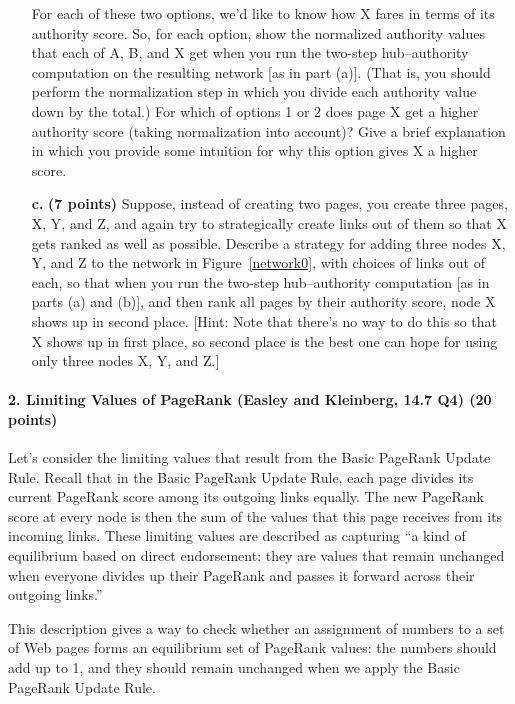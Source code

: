 \documentclass[11pt]{article}
\begin{document}
\begin{itemize}
For each of these two options, we’d like to know how X fares in terms
of its authority score. So, for each option, show the normalized authority
values that each of A, B, and X get when you run the two-step hub–authority
computation on the resulting network [as in part (a)]. (That is, you should
perform the normalization step in which you divide each authority value
down by the total.)
For which of options 1 or 2 does page X get a higher authority score
(taking normalization into account)? Give a brief explanation in which you
provide some intuition for why this option gives X a higher score.



\item[\textbf{c. }] \textbf{(7 points)}
Suppose, instead of creating two pages, you create three pages, X, Y, and
Z, and again try to strategically create links out of them so that X gets
ranked as well as possible.
Describe a strategy for adding three nodes X, Y, and Z to the network
in Figure~\ref{network0}, with choices of links out of each, so that when you run
the two-step hub–authority computation [as in parts (a) and (b)], and then
rank all pages by their authority score, node X shows up in second place.
[Hint: Note that there’s no way to do this so that X shows up in first
place, so second place is the best one can hope for using only three nodes
X, Y, and Z.]
\end{itemize}

\paragraph{2. Limiting Values of PageRank  (Easley and Kleinberg, 14.7 Q4) (20 points)}
Let's consider the limiting values that result from the Basic PageRank Update Rule. Recall that in the Basic PageRank Update Rule, each page divides its current PageRank score among its outgoing links equally. The new PageRank score at every node is then the sum of the values that this page receives from its incoming links. These limiting values are described as capturing ``a kind of equilibrium based on direct
endorsement: they are values that remain unchanged when everyone divides up
their PageRank and passes it forward across their outgoing links.''

This description gives a way to check whether an assignment of numbers to a set
of Web pages forms an equilibrium set of PageRank values: the numbers should add
up to 1, and they should remain unchanged when we apply the Basic PageRank
Update Rule.
\end{document}
